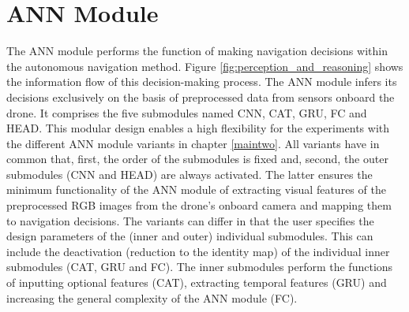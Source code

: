 \section{ANN Module}\label{sec:ann_module}
%
%
\newcommand{\R}[1]{\mathbb{R}^{#1}}
\newcommand{\setR}[1]{\left[#1\right]}

\newcommand{\setOfAllPosInts}{\mathbb{N}_{>0}}
\newcommand{\setOfInts}[1]{\left\{ #1 \right\}}
\newcommand{\placeholder}{\square}
\newcommand{\floor}[1]{\left\lfloor #1 \right\rfloor}
\newcommand{\series}[1]{\left(#1\right)}
\newcommand{\tuple}[1]{\left(#1\right)}
%
\newcommand{\rawRGB}{\img[]{\camera}{}{}{}}
\newcommand{\rawRGBFullInt}{\num[]{\camera}{\mxm}{}{}}
\newcommand{\rawRGBHeight}{\num[]{\camera}{\height}{}{}}
\newcommand{\rawRGBWidth}{\num[]{\camera}{\widthh}{}{}}
\newcommand{\rawRGBTimeStep}{\dur[]{\camera}{}{}{}}
\newcommand{\preprocRGB}[1]{\img[]{\preprocessed}{#1}{}{}}
\newcommand{\IMULinAcc}{\acc[\hat]{\imu}{}{\lrs}{}}
\newcommand{\IMUAngVel}{\angvel[\hat]{\imu}{}{\lrs}{}}
\newcommand{\IMUTimeStep}{\dur[]{\imu}{}{}{}}
\newcommand{\optFeatVec}[1]{\featvec[]{\optional}{#1}{}{}}
\newcommand{\CNNMap}{\Func[\user]{\cnn}{}{}{}}
\newcommand{\CNNNumC}{\num[]{\cnn}{\channel}{}{}}
\newcommand{\CNNHeight}{\num[]{\cnn}{\height}{}{}}
\newcommand{\CNNWidth}{\num[]{\cnn}{\widthh}{}{}}
\newcommand{\CNNOutp}{\num[]{\cnn}{\outp}{}{}}
\newcommand{\visFeatVec}[1]{\featvec[]{\visual}{#1}{}{}}
\newcommand{\CNNNumP}{\num[]{\cnn}{\params}{}{}}
\newcommand{\CATMap}{\Func[]{\cat}{}{}{}}
\newcommand{\CATInp}[1]{\num[]{\cat}{#1}{}{}}
\newcommand{\CATNumP}{\num[]{\cat}{\params}{}{}}
%
\newcommand{\batchSize}{\num[\user]{\batch}{}{}{}}
\newcommand{\seqLen}{\num[\user]{\seq}{}{}{}}
\newcommand{\mainFreq}{\freq[\user]{\main}{}{}{}}
\newcommand{\resizeFact}{\anything[\user]{\cnn}{\text{resize}}{}{}{s}}
%
%
The ANN module performs the function of making navigation decisions
within the autonomous navigation method.
Figure \ref{fig:perception_and_reasoning} shows the 
information flow of this decision-making process.
The ANN module infers its decisions exclusively 
on the basis of preprocessed data from sensors onboard the drone.
It comprises the five submodules named CNN, CAT, GRU, FC and HEAD.
This modular design enables a high flexibility for the experiments
with the different ANN module variants in chapter \ref{maintwo}.
All variants have in common that,
first, the order of the submodules is fixed
and, second, the outer submodules (CNN and HEAD)
are always activated.
The latter ensures the minimum functionality of the ANN module
of extracting visual features of the preprocessed 
RGB images from the drone's onboard camera
and mapping them to navigation decisions.
The variants can differ in that
the user specifies the design parameters of 
the (inner and outer) individual submodules.
This can include the deactivation (reduction to the identity map)
of the individual inner submodules (CAT, GRU and FC).
The inner submodules perform the functions of
inputting optional features (CAT),
extracting temporal features (GRU)
and increasing the general complexity of the ANN module (FC).

